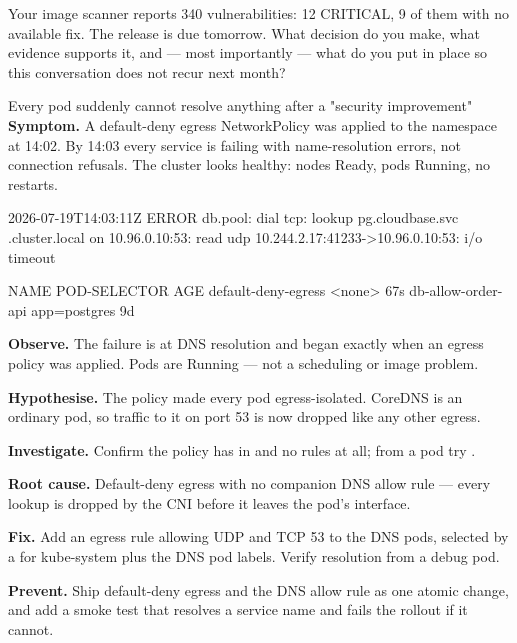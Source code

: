 \begin{thinkbox}
Your image scanner reports 340 vulnerabilities: 12 CRITICAL, 9 of them with no available fix. The release is due tomorrow. What decision do you make, what evidence supports it, and --- most importantly --- what do you put in place so this conversation does not recur next month?
\end{thinkbox}


\begin{debuglab}{Every pod suddenly cannot resolve anything after a "security improvement"}
\textbf{Symptom.} A default-deny egress NetworkPolicy was applied to the  namespace at 14:02. By 14:03 every service is failing with name-resolution errors, not connection refusals. The cluster looks healthy: nodes Ready, pods Running, no restarts.

\begin{outbox}
2026-07-19T14:03:11Z ERROR db.pool: dial tcp: lookup pg.cloudbase.svc
  .cluster.local on 10.96.0.10:53: read udp 10.244.2.17:41233->10.96.0.10:53:
  i/o timeout

NAME                   POD-SELECTOR   AGE
default-deny-egress    <none>         67s
db-allow-order-api     app=postgres   9d
\end{outbox}

\begin{tickcheck}
  \item \textbf{Observe.} The failure is at DNS resolution and began exactly when an egress policy was applied. Pods are Running --- not a scheduling or image problem.
  \item \textbf{Hypothesise.} The policy made every pod egress-isolated. CoreDNS is an ordinary pod, so traffic to it on port 53 is now dropped like any other egress.
  \item \textbf{Investigate.} Confirm the policy has  in  and no  rules at all; from a pod try .
  \item \textbf{Root cause.} Default-deny egress with no companion DNS allow rule --- every lookup is dropped by the CNI before it leaves the pod's interface.
  \item \textbf{Fix.} Add an egress rule allowing UDP and TCP 53 to the DNS pods, selected by a  for kube-system plus the DNS pod labels. Verify resolution from a debug pod.
  \item \textbf{Prevent.} Ship default-deny egress and the DNS allow rule as one atomic change, and add a smoke test that resolves a service name and fails the rollout if it cannot.
\end{tickcheck}
\end{debuglab}

